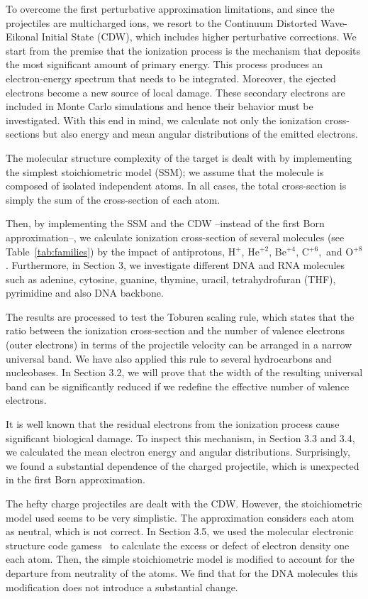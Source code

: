 \documentclass[preprint,12pt]{article}
\begin{document}
To overcome the first perturbative approximation limitations, and 
since the projectiles are multicharged ions, we resort to the 
Continuum Distorted Wave-Eikonal Initial State (CDW), which includes 
higher perturbative corrections. We start from the premise that the 
ionization process is the mechanism that deposits the most significant 
amount of primary energy. This process produces an electron-energy 
spectrum that needs to be integrated. Moreover, the ejected electrons 
become a new source of local damage. These secondary electrons are 
included in Monte Carlo simulations and hence their behavior must be
investigated. With this end in mind, we calculate not only the 
ionization cross-sections but also energy and mean angular distributions 
of the emitted electrons.

The molecular structure complexity of the target is dealt with by 
implementing the simplest stoichiometric model (SSM); we assume that 
the molecule is composed of isolated independent atoms. In all cases, 
the total cross-section is simply the sum of the cross-section of each 
atom.

Then, by implementing the SSM and the CDW --instead of the first Born 
approximation--, we calculate ionization cross-section of several 
molecules (see Table~\ref{tab:families}) by the impact of antiprotons,
H$^{+}$, He$^{+2}$, Be$^{+4}$, C$^{+6}$,\ and O$^{+8}$. Furthermore, 
in Section 3, we investigate different DNA and RNA molecules
such as adenine, cytosine, guanine, thymine, uracil, tetrahydrofuran 
(THF), pyrimidine and also DNA backbone.

The results are processed to test the Toburen scaling rule, which 
states that the ratio between the ionization cross-section and the 
number of valence electrons (outer electrons) in terms of the 
projectile velocity can be arranged in a narrow universal band. 
We have also applied this rule to several hydrocarbons and nucleobases. 
In Section 3.2, we will prove that the width of the resulting universal 
band can be significantly reduced if we redefine the effective number 
of valence electrons.

It is well known that the residual electrons from the ionization 
process cause significant biological damage. To inspect this mechanism, 
in Section 3.3 and 3.4, we calculated the mean electron energy and
angular distributions. Surprisingly, we found a substantial dependence 
of the charged projectile, which is unexpected in the first Born 
approximation. 

The hefty charge projectiles are dealt with the CDW. However, the 
stoichiometric model used seems to be very simplistic. The approximation
considers each atom as neutral, which is not correct. In Section 3.5, 
we used the molecular electronic structure code 
{\sc gamess}~\cite{gamess} to calculate the excess or defect of 
electron density one each atom. Then, the simple stoichiometric model is
modified to account for the departure from neutrality of the atoms. 
We find that for the DNA molecules this modification does not introduce 
a substantial change.
\end{document}
